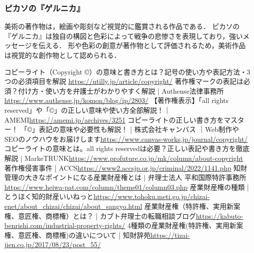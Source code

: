 \documentclass[titlepage,a4paper]{jsarticle}
\begin{document}
\subsubsection*{ピカソの『ゲルニカ』}
美術の著作物は，絵画や彫刻など視覚的に鑑賞される作品である．
ピカソの『ゲルニカ』は独自の構図と色彩によって戦争の悲惨さを表現しており，強いメッセージを伝える．
形や色彩の創意が著作物として評価されるため，美術作品は視覚的な創作物として認められる．
\begin{thebibliography}{99}
  コピーライト（Copyright ©）の意味と書き方とは？記号の使い方や表記方法・3つの必須項目を解説 \url{https://utilly.jp/article/copyright/}
  著作権マークの表記は必須？付け方・使い方を弁護士がわかりやすく解説 | Authense法律事務所\url{https://www.authense.jp/komon/blog/ip/2803/}
  【著作権表示】「all rights reserved」や「©」の正しい意味や使い方全部解説！｜AMEMI\url{https://amemi.jp/archives/3251}
  コピーライトの正しい書き方をマスター！ 「©」表記の意味や必要性も解説！ | 株式会社キャンバス ｜Web制作やSEOのノウハウをお届けします\url{https://www.canvas-works.jp/journal/copyright/}
  コピーライトの意味とは。all rights reservedは必要？正しい表記や書き方を徹底解説 | MarkeTRUNK\url{https://www.profuture.co.jp/mk/column/about-copyright}
  著作権侵害事件 | ACCS\url{https://www2.accsjp.or.jp/criminal/2022/1141.php}
  知財管理の大きなポイントになる産業財産権とは | 弁理士法人 平和国際特許事務所\url{https://www.heiwa-pat.com/column/theme01/column03.php}
  産業財産権の種類 | とうほく知的財産いいねっと\url{https://www.tohoku.meti.go.jp/chizai-enet/about_chizai/chizai/about_sangyo.html}
  産業財産権（特許権、実用新案権、意匠権、商標権）とは？ | カブト弁理士の転職相談ブログ\url{https://kabuto-benrishi.com/industrial-property-rights/}
  4種類の産業財産権(特許権、実用新案権、意匠権、商標権)の違いについて | 知財辞苑\url{https://tizai-jien.co.jp/2017/08/23/post_55/}
\end{thebibliography}
\end{document}

